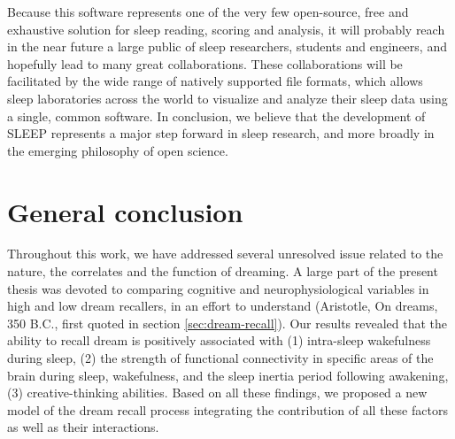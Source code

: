 Because this software represents one of the very few open-source, free and exhaustive solution for sleep reading, scoring and analysis, it will probably reach in the near future a large public of sleep researchers, students and engineers, and hopefully lead to many great collaborations. These collaborations will be facilitated by the wide range of natively supported file formats, which allows sleep laboratories across the world to visualize and analyze their sleep data using a single, common software. In conclusion, we believe that the development of SLEEP represents a major step forward in sleep research, and more broadly in the emerging philosophy of open science.

\cleardoublepage
\chapter{General conclusion}
\label{disc:conclusion}

Throughout this work, we have addressed several unresolved issue related to the nature, the correlates and the function of dreaming. A large part of the present thesis was devoted to comparing cognitive and neurophysiological variables in high and low dream recallers, in an effort to understand  (Aristotle, On dreams, 350 B.C., first quoted in section \ref{sec:dream-recall}). Our results revealed that the ability to recall dream is positively associated with (1) intra-sleep wakefulness during sleep, (2) the strength of functional connectivity in specific areas of the brain during sleep, wakefulness, and the sleep inertia period following awakening, (3) creative-thinking abilities. Based on all these findings, we proposed a new model of the dream recall process integrating the contribution of all these factors as well as their interactions. 
